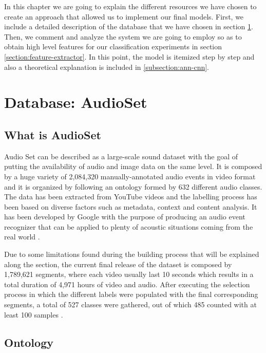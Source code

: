 
	In this chapter we are going to explain the different resources we have chosen to create an approach that allowed us to implement our final models. First, we include a detailed description of the database that we have chosen in section \ref{section:audioset}. Then, we comment and analyze the system we are going to employ so as to obtain high level features for our classification experiments in section \ref{section:feature-extractor}. In this point, the model is itemized step by step and also a theoretical explanation is included in \ref{subsection:ann-cnn}.
	
\section{Database: AudioSet}
\label{section:audioset}

\subsection{What is AudioSet} 
\label{subsection:what-is-audioset}

	Audio Set can be described as a large-scale sound dataset with the goal of putting the availability of audio and image data on the same level. It is composed by a huge variety of 2,084,320 manually-annotated audio events in video format and it is organized by following an ontology formed by 632 different audio classes. The data has been extracted from YouTube videos and the labelling process has been based on diverse factors such as metadata, context and content analysis. It has been developed by Google with the purpose of producing an audio event recognizer that can be applied to plenty of acoustic situations coming from the real world \cite{Gemmeke2017}.
	
	Due to some limitations found during the building process that will be explained along the section, the current final release of the dataset is composed by 1,789,621 segments, where each video usually last 10 seconds which results in a total duration of 4,971 hours of video and audio. After executing the selection process in which the different labels were populated with the final corresponding segments, a total of 527 classes were gathered, out of which 485 counted with at least 100 samples \cite{Gemmeke2017} \cite{SoundUnderstandinggroup2017}.

\subsection{Ontology}
\label{subsecition:ontology}

